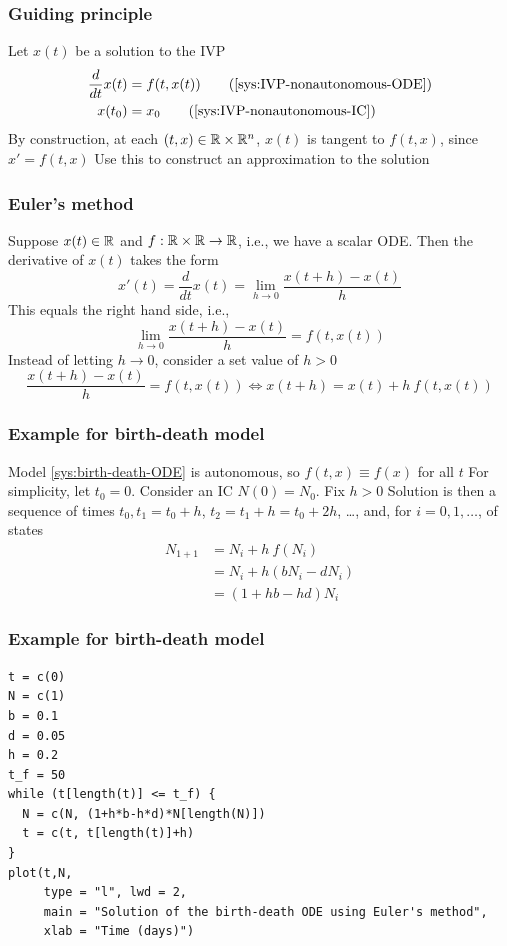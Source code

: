 \documentclass[aspectratio=169]{beamer}
\begin{document}
\begin{frame}\frametitle{Guiding principle}
Let $x(t)$ be a solution to the IVP
\begin{subequations}
\begin{align}
\frac{d}{dt}x(t) &= f(t,x(t)) 
\tag{\ref{sys:IVP-nonautonomous-ODE}}\\
x(t_0) &= x_0
\tag{\ref{sys:IVP-nonautonomous-IC}}
\end{align}
\end{subequations}
\vfill
By construction, at each $(t,x)\in\mathbb{R}\times\mathbb{R}^n$, $x(t)$ is tangent to $f(t,x)$, since $x'=f(t,x)$
\vfill
Use this to construct an approximation to the solution
\end{frame}

\begin{frame}\frametitle{Euler's method}
Suppose $x(t)\in\mathbb{R}$ and $f:\mathbb{R}\times\mathbb{R}\to\mathbb{R}$, i.e., we have a scalar ODE. Then the derivative of $x(t)$ takes the form
\vfill
\[
x'(t)=\frac{d}{dt}x(t) = \lim_{h\to 0}\frac{x(t+h)-x(t)}{h}
\]
\vfill
This equals the right hand side, i.e.,
\[
\lim_{h\to 0}\frac{x(t+h)-x(t)}{h} = f(t,x(t))
\]
\vfill
Instead of letting $h\to 0$, consider a set value of $h>0$
\[
\frac{x(t+h)-x(t)}{h} = f(t,x(t)) \iff
x(t+h) = x(t) + h\ f(t,x(t))
\]
\end{frame}


\begin{frame}\frametitle{Example for birth-death model}
Model \eqref{sys:birth-death-ODE} is autonomous, so $f(t,x)\equiv f(x)$ for all $t$
\vfill
For simplicity, let $t_0=0$. Consider an IC $N(0)=N_0$. Fix $h>0$
\vfill
Solution is then a sequence of times $t_0, t_1=t_0+h$, $t_2=t_1+h=t_0+2h$, \ldots, and, for $i=0,1,\ldots$, of states 
\begin{align*}
N_{1+1} &= N_i+h\ f(N_i) \\
&= N_i+h(bN_i-dN_i) \\
&= (1+hb-hd)N_i
\end{align*}
\end{frame}



\begin{frame}[fragile]\frametitle{Example for birth-death model}
\begin{lstlisting}
t = c(0)
N = c(1)
b = 0.1
d = 0.05
h = 0.2
t_f = 50
while (t[length(t)] <= t_f) {
  N = c(N, (1+h*b-h*d)*N[length(N)])
  t = c(t, t[length(t)]+h)
}
plot(t,N, 
     type = "l", lwd = 2,
     main = "Solution of the birth-death ODE using Euler's method",
     xlab = "Time (days)")
\end{lstlisting}
\end{frame}
\end{document}
